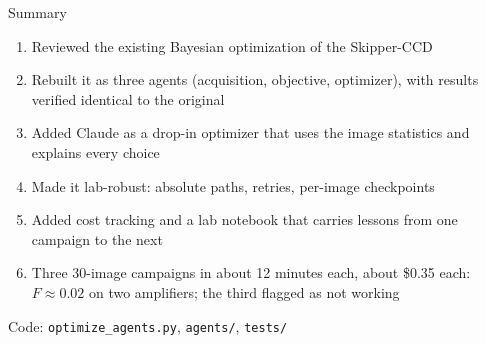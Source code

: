 \documentclass[aspectratio=169,10pt]{beamer}
\begin{document}
\begin{frame}{Summary}
  \begin{enumerate}
    \item Reviewed the existing Bayesian optimization of the Skipper-CCD
    \item Rebuilt it as three agents (acquisition, objective, optimizer),
          with results verified identical to the original
    \item Added Claude as a drop-in optimizer that uses the image statistics
          and explains every choice
    \item Made it lab-robust: absolute paths, retries, per-image checkpoints
    \item Added cost tracking and a lab notebook that carries lessons from
          one campaign to the next
    \item Three 30-image campaigns in about 12 minutes each, about \$0.35 each:
          $F \approx 0.02$ on two amplifiers; the third flagged as not working
  \end{enumerate}
  \vspace{4mm}
  \centering
  {\small Code: \texttt{optimize\_agents.py}, \texttt{agents/}, \texttt{tests/}}
\end{frame}
\end{document}
